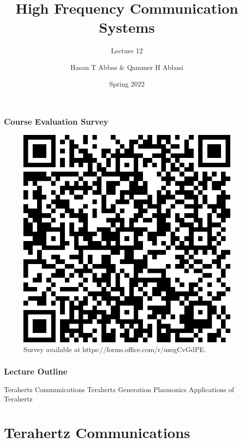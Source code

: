 \documentclass[10pt]{beamer}
\title{High Frequency Communication Systems}
\subtitle{Lecture 12}
\date{Spring 2022}
\author{Hasan T Abbas \& Qammer H Abbasi}
\begin{document}
\maketitle


\begin{frame}
    \frametitle{Course Evaluation Survey}

    \begin{figure}[h!]
        \centering
        \includegraphics[width=.5\textwidth]{QRCode for High-Frequency Communication Systems.png}
        \caption{Survey available at https://forms.office.com/r/uzegCvGdPE.}
    \end{figure}
\end{frame}

\begin{frame}[fragile]
    \frametitle{Lecture Outline}
    \begin{outline}[itemize]
        \1 Terahertz Communications
        \1 Terahertz Generation
        \1 Plasmonics
        \1 Applications of Terahertz
    \end{outline}
\end{frame}

\section{Terahertz Communications}
\end{document}
